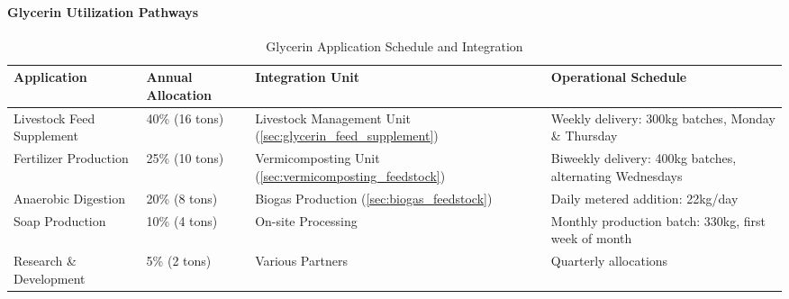 \paragraph{Glycerin Utilization Pathways}
\label{sec:glycerin_applications}
\begin{table}[h]
\centering
\caption{Glycerin Application Schedule and Integration}
\label{tab:glycerin_utilization}
\begin{tabular}{|p{2.5cm}|p{2.5cm}|p{3cm}|p{4cm}|}
\hline
\textbf{Application} & \textbf{Annual Allocation} & \textbf{Integration Unit} & \textbf{Operational Schedule} \\
\hline
Livestock Feed Supplement & 40\% (16 tons) & Livestock Management Unit (\ref{sec:glycerin_feed_supplement}) & Weekly delivery: 300kg batches, Monday \& Thursday \\
\hline
Fertilizer Production & 25\% (10 tons) & Vermicomposting Unit (\ref{sec:vermicomposting_feedstock}) & Biweekly delivery: 400kg batches, alternating Wednesdays \\
\hline
Anaerobic Digestion & 20\% (8 tons) & Biogas Production (\ref{sec:biogas_feedstock}) & Daily metered addition: 22kg/day \\
\hline
Soap Production & 10\% (4 tons) & On-site Processing & Monthly production batch: 330kg, first week of month \\
\hline
Research \& Development & 5\% (2 tons) & Various Partners & Quarterly allocations \\
\hline
\end{tabular}
\end{table}

